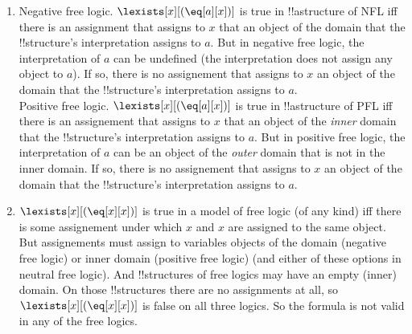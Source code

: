 \documentclass[../../../include/open-logic-section]{subfiles}
\begin{document}
\begin{prob}[Semantics]
\begin{ans}
\begin{enumerate}
\item Negative free logic. $\lexists[x][(\eq[a][x])]$ is true in
	!!a{structure} of NFL iff there is an assignment that assigns to
	$x$ that an object of the domain that the !!{structure}'s
	interpretation assigns to $a$. But in negative free logic, the
	interpretation of $a$ can be undefined (the interpretation does
	not assign any object to $a$). If so, there is no assignement that
	assigns to $x$ an object of the domain that the !!{structure}'s
	interpretation assigns to $a$.\\
	Positive free logic. $\lexists[x][(\eq[a][x])]$ is true in
	!!a{structure} of PFL iff there is an assignement that assigns to
	$x$ that an object of the \emph{inner} domain that the
	!!{structure}'s interpretation assigns to $a$. But in positive
	free logic, the interpretation of $a$ can be an object of the
	\emph{outer} domain that is not in the inner domain. If so, there
	is no assignement that assigns to $x$ an object of the domain that
	the !!{structure}'s interpretation assigns to $a$.
\item $\lexists[x][(\eq[x][x])]$ is true in a model of free logic (of
	any kind) iff there is some assignement under which $x$ and $x$
	are assigned to the same object. But assignements must assign to
	variables objects of the domain (negative free logic) or inner
	domain (positive free logic) (and either of these options in
	neutral free logic). And !!{structure}s of free logics may have an
	empty (inner) domain. On those !!{structure}s there are no
	assignments at all, so $\lexists[x][(\eq[x][x])]$ is false on all
	three logics. So the formula is not valid in any of the free
	logics.
\end{enumerate}
\end{ans}
\end{prob}
\end{document}
